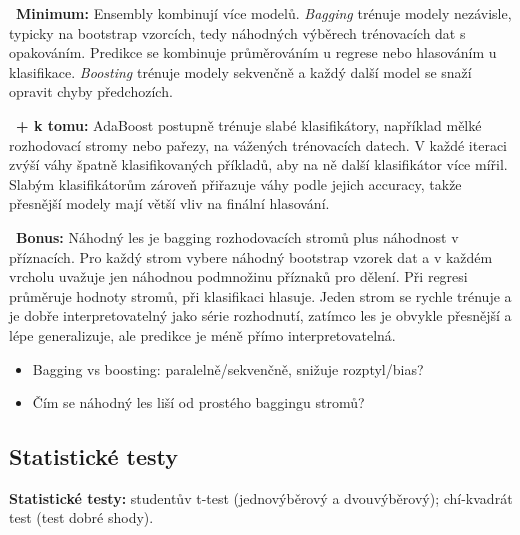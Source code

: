 \begin{odpoved}
\setlength{\parskip}{2pt}
\noindent{}\ \textbf{Minimum:} Ensembly kombinují více modelů. \emph{Bagging} trénuje modely nezávisle, typicky na bootstrap vzorcích, tedy náhodných výběrech trénovacích dat s opakováním. Predikce se kombinuje průměrováním u regrese nebo hlasováním u klasifikace. \emph{Boosting} trénuje modely sekvenčně a každý další model se snaží opravit chyby předchozích.\par
\noindent{}\ \textbf{+ k tomu:} AdaBoost postupně trénuje slabé klasifikátory, například mělké rozhodovací stromy nebo pařezy, na vážených trénovacích datech. V každé iteraci zvýší váhy špatně klasifikovaných příkladů, aby na ně další klasifikátor více mířil. Slabým klasifikátorům zároveň přiřazuje váhy podle jejich accuracy, takže přesnější modely mají větší vliv na finální hlasování.\par
\noindent{}\ \textbf{Bonus:} Náhodný les je bagging rozhodovacích stromů plus náhodnost v příznacích. Pro každý strom vybere náhodný bootstrap vzorek dat a v každém vrcholu uvažuje jen náhodnou podmnožinu příznaků pro dělení. Při regresi průměruje hodnoty stromů, při klasifikaci hlasuje. Jeden strom se rychle trénuje a je dobře interpretovatelný jako série rozhodnutí, zatímco les je obvykle přesnější a lépe generalizuje, ale predikce je méně přímo interpretovatelná.
\end{odpoved}
\begin{recall}
\begin{itemize}[leftmargin=1.2em,itemsep=0pt,topsep=1pt]
  \item Bagging vs boosting: paralelně/sekvenčně, snižuje rozptyl/bias?
  \item Čím se náhodný les liší od prostého baggingu stromů?
\end{itemize}
\end{recall}

\subsection{Statistické testy}

\begin{tema}
\textbf{Statistické testy:} studentův t-test (jednovýběrový a dvouvýběrový);
chí-kvadrát test (test dobré shody).
\end{tema}
\begin{vezkratce}
\end{vezkratce}

